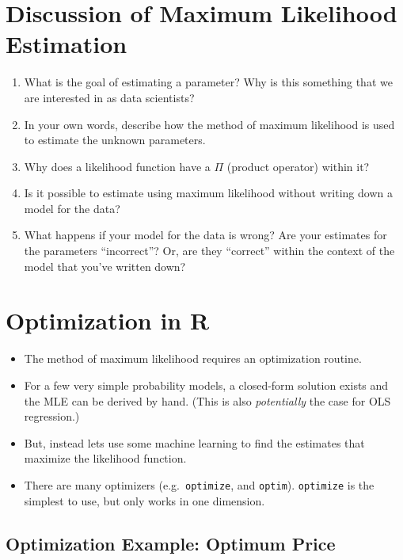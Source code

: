 \documentclass[
]{book}
\providecommand{\tightlist}{%
  \setlength{\itemsep}{0pt}\setlength{\parskip}{0pt}}
\theoremstyle{definition}
\theoremstyle{definition}
\theoremstyle{definition}
\theoremstyle{definition}
\theoremstyle{remark}
\begin{document}
\hypertarget{discussion-of-maximum-likelihood-estimation}{%
\section{Discussion of Maximum Likelihood Estimation}\label{discussion-of-maximum-likelihood-estimation}}

\begin{enumerate}
\def\labelenumi{\arabic{enumi}.}
\tightlist
\item
  What is the goal of estimating a parameter? Why is this something that we are interested in as data scientists?
\item
  In your own words, describe how the method of maximum likelihood is used to estimate the unknown parameters.
\item
  Why does a likelihood function have a \(\Pi\) (product operator) within it?
\item
  Is it possible to estimate using maximum likelihood without writing down a model for the data?
\item
  What happens if your model for the data is wrong? Are your estimates for the parameters ``incorrect''? Or, are they ``correct'' within the context of the model that you've written down?
\end{enumerate}

\hypertarget{optimization-in-r}{%
\section{Optimization in R}\label{optimization-in-r}}

\begin{itemize}
\tightlist
\item
  The method of maximum likelihood requires an optimization routine.
\item
  For a few very simple probability models, a closed-form solution exists and the MLE can be derived by hand. (This is also \emph{potentially} the case for OLS regression.)
\item
  But, instead lets use some machine learning to find the estimates that maximize the likelihood function.
\item
  There are many optimizers (e.g.~\texttt{optimize}, and \texttt{optim}). \texttt{optimize} is the simplest to use, but only works in one dimension.
\end{itemize}

\hypertarget{optimization-example-optimum-price}{%
\subsection{Optimization Example: Optimum Price}\label{optimization-example-optimum-price}}
\end{document}
